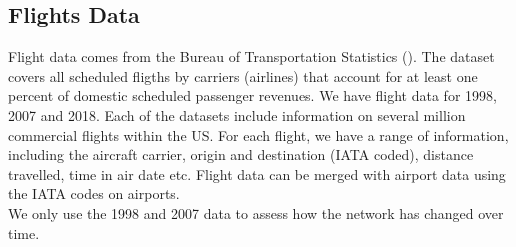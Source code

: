 
\subsection{Flights Data}
\label{subsec:Flight_Data}
Flight data comes from the Bureau of Transportation Statistics (\citet{BTS}). The dataset covers all scheduled fligths by carriers (airlines) that account for at least one percent of domestic scheduled passenger revenues. We have flight data for 1998, 2007 and 2018. Each of the datasets include information on several million commercial flights within the US. For each flight, we have a range of information, including the aircraft carrier, origin and destination (IATA coded), distance travelled, time in air date etc. Flight data can be merged with airport data using the IATA codes on airports. \medskip\\
We only use the 1998 and 2007 data to assess how the network has changed over time.




